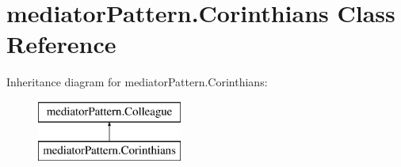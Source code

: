 \hypertarget{classmediator_pattern_1_1_corinthians}{}\section{mediator\+Pattern.\+Corinthians Class Reference}
\label{classmediator_pattern_1_1_corinthians}
Inheritance diagram for mediator\+Pattern.\+Corinthians\+:\begin{figure}[H]
\begin{center}
\leavevmode
\includegraphics[height=2.000000cm]{classmediator_pattern_1_1_corinthians}
\end{center}
\end{figure}
